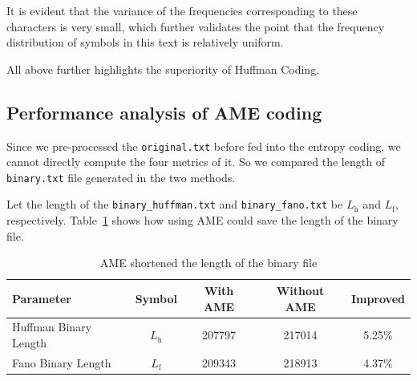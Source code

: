 \documentclass[12pt,twoside]{article}
\begin{document}
It is evident that the variance of the frequencies corresponding to these characters is very small, which further validates the point that the frequency distribution of symbols in this text is relatively uniform.

All above further highlights the superiority of Huffman Coding.

\subsection{Performance analysis of AME coding}

Since we pre-processed the \texttt{original.txt} before fed into the entropy coding, we cannot directly compute the four metrics of it. So we compared the length of \texttt{binary.txt} file generated in the two methods. 

Let the length of the \texttt{binary\_huffman.txt} and \texttt{binary\_fano.txt} be $L_{\text{h}}$ and $L_{\text{f}}$, respectively. Table~\ref{tab:amematrics} shows how using AME could save the length of the binary file.


\begin{table}[h!]
    \caption{AME shortened the length of the binary file}
    \label{tab:amematrics}
    \centering
    \begin{tabular}{l|cccc}
    \toprule
    \textbf{Parameter} & \textbf{Symbol} & \textbf{With AME} & \textbf{Without AME} & \textbf{Improved} \\ \hline
    Huffman Binary Length & $L_{\text{h}}$ & 207797 & 217014 & 5.25\%  \\ 
    Fano Binary Length & $L_{\text{f}}$ & 209343 & 218913 & 4.37\% \\ 
    \bottomrule
    \end{tabular}
\end{table}
\end{document}
